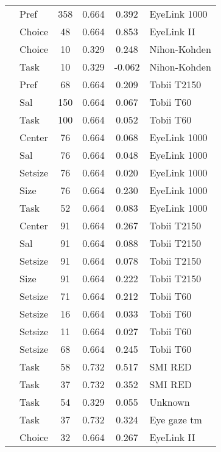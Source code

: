 \begin{longtable}{p{8cm}lcccl}
  \cite{miller2015} & Pref & 358 & 0.664 & 0.392 & EyeLink 1000 \\ 
  \cite{mitsuda2014} & Choice & 48 & 0.664 & 0.853 & EyeLink II \\ 
  \cite{nittono2009} & Choice & 10 & 0.329 & 0.248 & Nihon-Kohden \\ 
  \cite{nittono2009} & Task & 10 & 0.329 & -0.062 & Nihon-Kohden \\ 
  \cite{orquin2013} & Pref & 68 & 0.664 & 0.209 & Tobii T2150 \\ 
  \cite{orquin2015a} & Sal & 150 & 0.664 & 0.067 & Tobii T60 \\ 
  \cite{orquin2015a} & Task & 100 & 0.664 & 0.052 & Tobii T60 \\ 
  \cite{orquin2019a} & Center & 76 & 0.664 & 0.068 & EyeLink 1000 \\ 
  \cite{orquin2019a} & Sal & 76 & 0.664 & 0.048 & EyeLink 1000 \\ 
  \cite{orquin2019a} & Setsize & 76 & 0.664 & 0.020 & EyeLink 1000 \\ 
  \cite{orquin2019a} & Size & 76 & 0.664 & 0.230 & EyeLink 1000 \\ 
  \cite{orquin2019a} & Task & 52 & 0.664 & 0.083 & EyeLink 1000 \\ 
  \cite{orquin2019a} & Center & 91 & 0.664 & 0.267 & Tobii T2150 \\ 
  \cite{orquin2019a} & Sal & 91 & 0.664 & 0.088 & Tobii T2150 \\ 
  \cite{orquin2019a} & Setsize & 91 & 0.664 & 0.078 & Tobii T2150 \\ 
  \cite{orquin2019a} & Size & 91 & 0.664 & 0.222 & Tobii T2150 \\ 
  \cite{orquin2020osfb} & Setsize & 71 & 0.664 & 0.212 & Tobii T60 \\ 
  \cite{orquin2020osfb} & Setsize & 16 & 0.664 & 0.033 & Tobii T60 \\ 
  \cite{orquin2020osfb} & Setsize & 11 & 0.664 & 0.027 & Tobii T60 \\ 
  \cite{orquin2020osfb} & Setsize & 68 & 0.664 & 0.245 & Tobii T60 \\ 
  \cite{paernamets2015a} & Task & 58 & 0.732 & 0.517 & SMI RED \\ 
  \cite{paernamets2015a} & Task & 37 & 0.732 & 0.352 & SMI RED \\ 
  \cite{pieters1999} & Task & 54 & 0.329 & 0.055 & Unknown \\ 
  \cite{rubaltelli2012} & Task & 37 & 0.732 & 0.324 & Eye gaze tm \\ 
  \cite{schotter2010a} & Choice & 32 & 0.664 & 0.267 & EyeLink II \\ 

\end{longtable}
